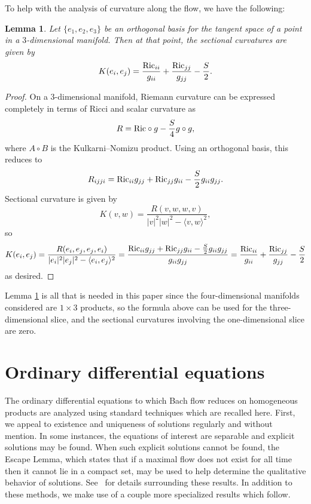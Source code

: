 \documentclass[pdftex]{sigma}
\numberwithin{equation}{section}
\newtheorem{Lemma}[Theorem]{Lemma}
\begin{document}
To help with the analysis of curvature along the flow, we have the following:

\begin{Lemma} \label{sectionalcurvaturelemma}Let $\{e_1, e_2, e_3\}$ be an orthogonal basis for the tangent space of a point in a $3$-dimensional manifold. Then at that point, the sectional curvatures are given by
\[
K(e_i, e_j) = \frac{{\rm Ric}_{ii}}{g_{ii}} + \frac{{\rm Ric}_{jj}}{g_{jj}} - \frac{S}{2}.
\]
\end{Lemma}

\begin{proof}
On a 3-dimensional manifold, Riemann curvature can be expressed completely in terms of Ricci and scalar curvature as
\[
R = {\rm Ric} \circ g - \frac{S}{4} g \circ g,
\]
where $A \circ B$ is the Kulkarni--Nomizu product. Using an orthogonal basis, this reduces to
\[
R_{ijji} = {\rm Ric}_{ii} g_{jj} + {\rm Ric}_{jj} g_{ii} - \frac{S}{2} g_{ii} g_{jj}.
\]
Sectional curvature is given by
\[
K(v, w) = \frac{R(v, w, w, v)}{|v|^2 |w|^2 - \langle v, w \rangle^2},
\]
so
\begin{gather*}
K(e_i, e_j) = \frac{R(e_i, e_j, e_j, e_i)}{|e_i|^2 |e_j|^2 - \langle e_i, e_j \rangle^2}
		 = \frac{{\rm Ric}_{ii} g_{jj} + {\rm Ric}_{jj} g_{ii} - \frac{S}{2} g_{ii} g_{jj}}{g_{ii} g_{jj}} = \frac{{\rm Ric}_{ii}}{g_{ii}} + \frac{{\rm Ric}_{jj}}{g_{jj}} - \frac{S}{2}
\end{gather*}
as desired.
\end{proof}

Lemma \ref{sectionalcurvaturelemma} is all that is needed in this paper since the four-dimensional manifolds considered are $1 \times 3$ products, so the formula above can be used for the three-dimensional slice, and the sectional curvatures involving the one-dimensional slice are zero.

\section{Ordinary differential equations} \label{odesec}

The ordinary differential equations to which Bach flow reduces on homogeneous products are analyzed using standard techniques which are recalled here. First, we appeal to existence and uniqueness of solutions regularly and without mention. In some instances, the equations of interest are separable and explicit solutions may be found. When such explicit solutions cannot be found, the Escape Lemma, which states that if a maximal flow does not exist for all time then it cannot lie in a compact set, may be used to help determine the qualitative behavior of solutions. See~\cite{Jack2} for details surrounding these results. In addition to these methods, we make use of a couple more specialized results which follow.
\end{document}
